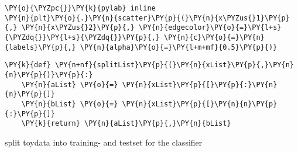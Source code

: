 {\par%
\vspace{-1\baselineskip}%
}%
\begin{notebookcell}[]%
\begin{addmargin}[\cellleftmargin]{0em}%
{\smaller%
\par%
%
\vspace{-1\smallerfontscale}%
\begin{Verbatim}[commandchars=\\\{\}]
\PY{o}{\PYZpc{}}\PY{k}{pylab} inline
\PY{n}{plt}\PY{o}{.}\PY{n}{scatter}\PY{p}{(}\PY{n}{x\PYZus{}1}\PY{p}{,} \PY{n}{x\PYZus{}2}\PY{p}{,} \PY{n}{edgecolor}\PY{o}{=}\PY{l+s}{\PYZdq{}}\PY{l+s}{\PYZdq{}}\PY{p}{,} \PY{n}{c}\PY{o}{=}\PY{n}{labels}\PY{p}{,} \PY{n}{alpha}\PY{o}{=}\PY{l+m+mf}{0.5}\PY{p}{)}
\end{Verbatim}
%
\par%
\vspace{-1\smallerfontscale}}%
\end{addmargin}
\end{notebookcell}



{\par%
\vspace{-1\baselineskip}%
}%
\begin{notebookcell}[]%
\begin{addmargin}[\cellleftmargin]{0em}%
{\smaller%
\par%
%
\vspace{-1\smallerfontscale}%
\begin{Verbatim}[commandchars=\\\{\}]
\PY{k}{def} \PY{n+nf}{splitList}\PY{p}{(}\PY{n}{xList}\PY{p}{,}\PY{n}{n}\PY{p}{)}\PY{p}{:}
    \PY{n}{aList} \PY{o}{=} \PY{n}{xList}\PY{p}{[}\PY{p}{:}\PY{n}{n}\PY{p}{]}
    \PY{n}{bList} \PY{o}{=} \PY{n}{xList}\PY{p}{[}\PY{n}{n}\PY{p}{:}\PY{p}{]}
    \PY{k}{return} \PY{n}{aList}\PY{p}{,}\PY{n}{bList}
\end{Verbatim}
%
\par%
\vspace{-1\smallerfontscale}}%
\end{addmargin}
\end{notebookcell}


    split toydata into training- and testset for the classifier



